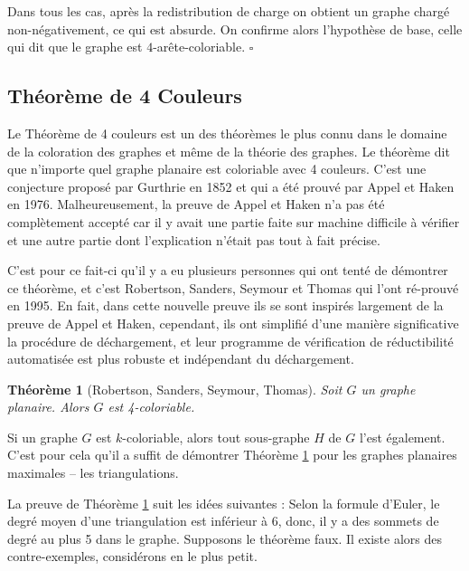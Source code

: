 \documentclass[10pt,a4paper]{article}
\newtheorem{theorem}{Théorème}
\newtheorem{proposition}{Proposition}
\newcommand{\ep}{{\hfill $\square$}}
\begin{document}
Dans tous les cas, après la redistribution de charge on obtient un graphe chargé non-négativement, ce qui est absurde. On confirme alors l'hypothèse de base, celle qui dit que le graphe est $4$-arête-coloriable.
\ep 


\subsection{Théorème de 4 Couleurs}

Le Théorème de 4 couleurs est un des théorèmes le plus connu dans le domaine de la coloration des graphes et même de la théorie des graphes. Le théorème dit que n'importe quel graphe planaire est coloriable avec 4 couleurs. C'est une conjecture proposé par Gurthrie en 1852 et qui a été prouvé par Appel et Haken \cite{A&H} en 1976. Malheureusement, la preuve de Appel et Haken n'a pas été complètement accepté car il y avait une partie faite sur machine difficile à vérifier et une autre partie dont l'explication n'était pas tout à fait précise.

C'est pour ce fait-ci qu'il y a eu plusieurs personnes qui ont tenté de démontrer ce théorème, et c'est Robertson, Sanders, Seymour et Thomas \cite{T4C} qui l'ont ré-prouvé en 1995. En fait, dans cette nouvelle preuve ils se sont inspirés largement de la preuve de Appel et Haken, cependant, ils ont simplifié d'une manière significative la procédure de déchargement, et leur programme de vérification de réductibilité automatisée est plus robuste et indépendant du déchargement.


\begin{theorem}[Robertson, Sanders, Seymour, Thomas]


Soit $G$ un graphe planaire. Alors $G$ est 4-coloriable.
\label{th:4CT}
\end{theorem}

Si un graphe $G$ est $k$-coloriable, alors tout sous-graphe $H$ de $G$ l'est également. C'est pour cela qu'il a suffit de démontrer Théorème \ref{th:4CT} pour les graphes planaires maximales -- les triangulations.




La preuve de Théorème \ref{th:4CT} suit les idées suivantes : Selon la formule d'Euler, le degré moyen d'une triangulation est inférieur à 6, donc, il y a des sommets de degré au plus 5 dans le graphe. Supposons le théorème faux. Il existe alors des contre-exemples, considérons en le plus petit. 
\end{document}
